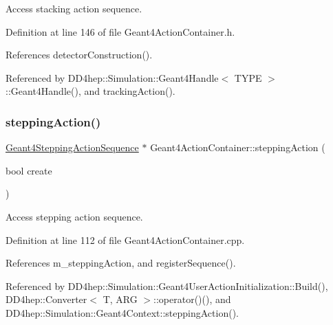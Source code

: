 Access stacking action sequence. 



Definition at line 146 of file Geant4\+Action\+Container.\+h.



References detector\+Construction().



Referenced by D\+D4hep\+::\+Simulation\+::\+Geant4\+Handle$<$ T\+Y\+P\+E $>$\+::\+Geant4\+Handle(), and tracking\+Action().

\hypertarget{class_d_d4hep_1_1_simulation_1_1_geant4_action_container_a75a0fa686f783e175eedbd57ed3abbdc}{}\label{class_d_d4hep_1_1_simulation_1_1_geant4_action_container_a75a0fa686f783e175eedbd57ed3abbdc} 
\subsubsection{\texorpdfstring{stepping\+Action()}{steppingAction()}\hspace{0.1cm}{\footnotesize\ttfamily [1/2]}}
{\footnotesize\ttfamily \hyperlink{class_d_d4hep_1_1_simulation_1_1_geant4_stepping_action_sequence}{Geant4\+Stepping\+Action\+Sequence} $\ast$ Geant4\+Action\+Container\+::stepping\+Action (\begin{DoxyParamCaption}\item[{bool}]{create }\end{DoxyParamCaption})}



Access stepping action sequence. 



Definition at line 112 of file Geant4\+Action\+Container.\+cpp.



References m\+\_\+stepping\+Action, and register\+Sequence().



Referenced by D\+D4hep\+::\+Simulation\+::\+Geant4\+User\+Action\+Initialization\+::\+Build(), D\+D4hep\+::\+Converter$<$ T, A\+R\+G $>$\+::operator()(), and D\+D4hep\+::\+Simulation\+::\+Geant4\+Context\+::stepping\+Action().

\hypertarget{class_d_d4hep_1_1_simulation_1_1_geant4_action_container_aa9fd5d34c9a076788e24abd8906f6e3a}{}\label{class_d_d4hep_1_1_simulation_1_1_geant4_action_container_aa9fd5d34c9a076788e24abd8906f6e3a} 
